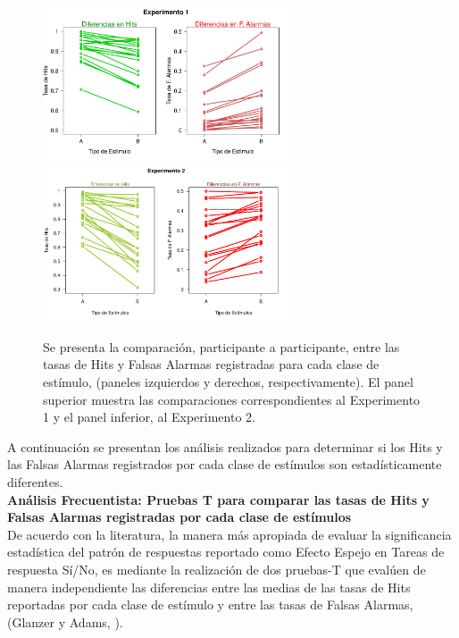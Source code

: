 \begin{figure}[th]
\centering
\includegraphics[width=0.65\textwidth]{Figures/Diff_Rate_E1}\\ 
\includegraphics[width=0.65\textwidth]{Figures/Diff_Rate_E2}\\
\caption[Diferencias entre las Tasas de Hits y Falsas Alarmas registradas en cada clase de estímulos]{Se presenta la comparación, participante a participante, entre las tasas de Hits y Falsas Alarmas registradas para cada clase de estímulo, (paneles izquierdos y derechos, respectivamente). El panel superior muestra las comparaciones correspondientes al Experimento 1 y el panel inferior, al Experimento 2.}
\label{fig:Diff_Rate}
\end{figure}

A continuación se presentan los análisis realizados para determinar si los Hits y las Falsas Alarmas registrados por cada clase de estímulos son estadísticamente diferentes.\\

\textbf{Análisis Frecuentista: Pruebas T para comparar las tasas de Hits y Falsas Alarmas registradas por cada clase de estímulos}\\

De acuerdo con la literatura, la manera más apropiada de evaluar la significancia estadística del patrón de respuestas reportado como Efecto Espejo en Tareas de respuesta Sí/No, es mediante la realización de dos pruebas-T que evalúen de manera independiente las diferencias entre las medias de las tasas de Hits reportadas por cada clase de estímulo y entre las tasas de Falsas Alarmas, (Glanzer y Adams, \citeyear{Glanzer1990}).\\

